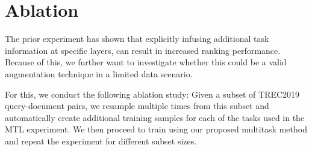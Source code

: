 \section{Ablation}
The prior experiment has shown that explicitly infusing additional task information at specific layers, can result in increased ranking performance. Because of this, we further want to investigate whether this could be a valid augmentation technique in a limited data scenario.

For this, we conduct the following ablation study: Given a subset of TREC2019 query-document pairs, we resample multiple times from this subset and automatically create additional training samples for each of the tasks used in the MTL experiment. We then proceed to train using our proposed multitask method and repeat the experiment for different subset sizes.

